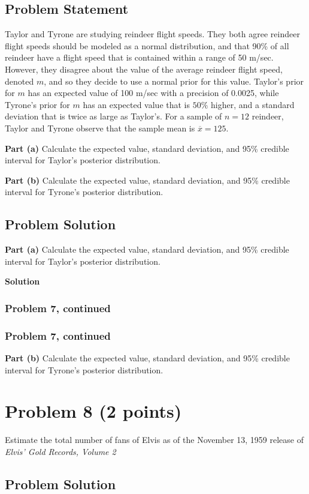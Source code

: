 \documentclass[12pt]{article}
\theoremstyle{definition}
\begin{document}
\subsection*{Problem Statement}

Taylor and Tyrone are studying reindeer flight speeds. They both agree reindeer flight speeds should be modeled as a normal distribution, and that 90\% of all reindeer have a flight speed that is contained within a range of 50 m/sec. However, they disagree about the value of the average reindeer flight speed, denoted $m$, and so they decide to use a normal prior for this value. Taylor's prior for $m$ has an expected value of 100 m/sec with a precision of 0.0025, while Tyrone's prior for $m$ has an expected value that is $50\%$ higher, and a standard deviation that is twice as large as Taylor's. For a sample of $n = 12$ reindeer, Taylor and Tyrone observe that the sample mean is $\overline{x} = 125$.

\bigskip
\noindent
{\bf Part (a)} Calculate the expected value, standard deviation, and 95\% credible interval for Taylor's posterior distribution.

\bigskip
\noindent
{\bf Part (b)} Calculate the expected value, standard deviation, and 95\% credible interval for Tyrone's posterior distribution.


\subsection*{Problem Solution}

\bigskip
\noindent
{\bf Part (a)} Calculate the expected value, standard deviation, and 95\% credible interval for Taylor's posterior distribution.

\bigskip
\noindent
{\bf Solution}



\newpage
\subsubsection*{Problem 7, continued}


\newpage
\subsubsection*{Problem 7, continued}

\noindent
{\bf Part (b)} Calculate the expected value, standard deviation, and 95\% credible interval for Tyrone's posterior distribution.



\newpage
\section*{Problem 8 (2 points)}

Estimate the total number of fans of Elvis as of the November 13, 1959 release of {\em Elvis' Gold Records, Volume 2}

\subsection*{Problem Solution}
\end{document}
